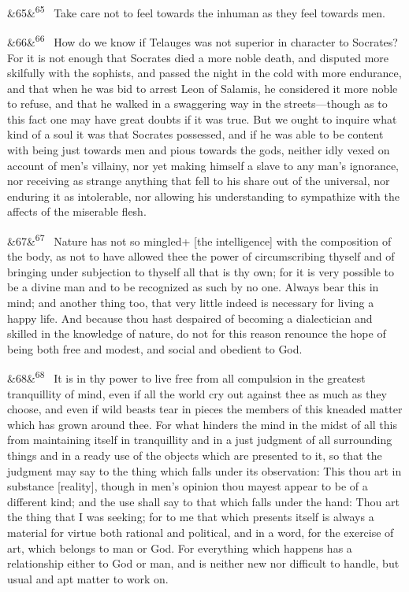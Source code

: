 \documentclass[12pt]{article}
\newcommand{\para}[1][]{\par\noindent\ifx&#1&\else\textsuperscript{\footnotesize #1}~\fi}
\begin{document}
\para[65] Take care not to feel towards the inhuman as they feel towards
men.

\para[66] How do we know if Telauges was not superior in character to
Socrates? For it is not enough that Socrates died a more noble death,
and disputed more skilfully with the sophists, and passed the night in
the cold with more endurance, and that when he was bid to arrest Leon
of Salamis, he considered it more noble to refuse, and that he walked in
a swaggering way in the streets---though as to this fact one may have
great doubts if it was true. But we ought to inquire what kind of a soul
it was that Socrates possessed, and if he was able to be content with
being just towards men and pious towards the gods, neither idly vexed on
account of men's villainy, nor yet making himself a slave to any man's
ignorance, nor receiving as strange anything that fell to his share out
of the universal, nor enduring it as intolerable, nor allowing his
understanding to sympathize with the affects of the miserable flesh.

\para[67] Nature has not so mingled+ [the intelligence] with the composition
of the body, as not to have allowed thee the power of circumscribing
thyself and of bringing under subjection to thyself all that is thy own;
for it is very possible to be a divine man and to be recognized as such
by no one. Always bear this in mind; and another thing too, that very
little indeed is necessary for living a happy life. And because thou
hast despaired of becoming a dialectician and skilled in the knowledge
of nature, do not for this reason renounce the hope of being both free
and modest, and social and obedient to God.

\para[68] It is in thy power to live free from all compulsion in the greatest
tranquillity of mind, even if all the world cry out against thee as
much as they choose, and even if wild beasts tear in pieces the members
of this kneaded matter which has grown around thee. For what hinders the
mind in the midst of all this from maintaining itself in tranquillity
and in a just judgment of all surrounding things and in a ready use of
the objects which are presented to it, so that the judgment may say to
the thing which falls under its observation: This thou art in substance
[reality], though in men's opinion thou mayest appear to be of a
different kind; and the use shall say to that which falls under the
hand: Thou art the thing that I was seeking; for to me that which
presents itself is always a material for virtue both rational and
political, and in a word, for the exercise of art, which belongs to man
or God. For everything which happens has a relationship either to God or
man, and is neither new nor difficult to handle, but usual and apt
matter to work on.
\end{document}

